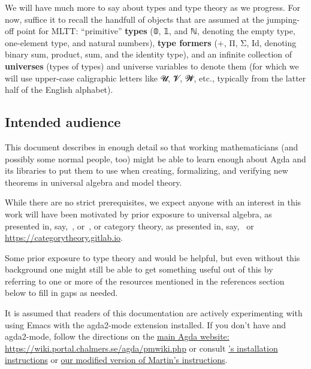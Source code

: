 We will have much more to say about types and type theory as we progress. For now, suffice it to recall the handfull of objects that are assumed at the jumping-off point for MLTT: ``primitive'' \textbf{types} (𝟘, 𝟙, and ℕ, denoting the empty type, one-element type, and natural numbers), \textbf{type formers} (+, Π, Σ, Id, denoting binary sum, product, sum, and the identity type), and an infinite collection of \textbf{universes} (types of types) and universe variables to denote them (for which we will use upper-case caligraphic letters like 𝓤, 𝓥, 𝓦, etc., typically from the latter half of the English alphabet).

\subsection*{Intended audience}
This document describes \agdaualib in enough detail so that working mathematicians (and possibly some normal people, too) might be able to learn enough about Agda and its libraries to put them to use when creating, formalizing, and verifying new theorems in universal algebra and model theory.

While there are no strict prerequisites, we expect anyone with an interest in this work will have been motivated by prior exposure to universal algebra, as presented in, say,~\cite{Bergman:2012}, or~\cite{McKenzie:1987}, or category theory, as presented in, say,~\cite{Riehl:2017} or \url{https://categorytheory.gitlab.io}.

Some prior exposure to type theory and \agda would be helpful, but even without this background one might still be able to get something useful out of this by referring to one or more of the resources mentioned in the references section below to fill in gaps as needed.

It is assumed that readers of this documentation are actively experimenting with \agda using Emacs with the
agda2-mode extension installed. If you don't have \agda and agda2-mode, follow the directions on the \href{https://wiki.portal.chalmers.se/agda/pmwiki.php}{main Agda website: https://wiki.portal.chalmers.se/agda/pmwiki.php} or
consult \href{https://github.com/martinescardo/HoTT-UF-Agda-Lecture-Notes/blob/master/INSTALL.md}{\MartinEscardo's installation instructions} or \href{https://gitlab.com/ualib/ualib.gitlab.io/-/blob/master/INSTALL_AGDA.md}{our
modified version of Martin's instructions}.

